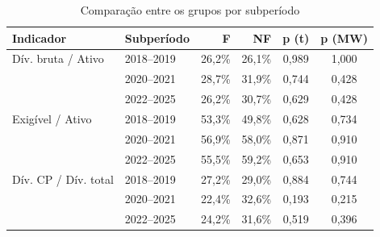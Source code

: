 \begin{table}[htb]
\caption{Comparação entre os grupos por subperíodo}\label{tab:subperiodos}
\centering\footnotesize\setlength{\tabcolsep}{4pt}
\begin{tabular}{llrrcc}
\toprule
Indicador & Subperíodo & F & NF & p (t) & p (MW) \\
\midrule
Dív. bruta / Ativo & 2018--2019 & 26,2\% & 26,1\% & 0,989 & 1,000 \\
 & 2020--2021 & 28,7\% & 31,9\% & 0,744 & 0,428 \\
 & 2022--2025 & 26,2\% & 30,7\% & 0,629 & 0,428 \\
Exigível / Ativo & 2018--2019 & 53,3\% & 49,8\% & 0,628 & 0,734 \\
 & 2020--2021 & 56,9\% & 58,0\% & 0,871 & 0,910 \\
 & 2022--2025 & 55,5\% & 59,2\% & 0,653 & 0,910 \\
Dív. CP / Dív. total & 2018--2019 & 27,2\% & 29,0\% & 0,884 & 0,744 \\
 & 2020--2021 & 22,4\% & 32,6\% & 0,193 & 0,215 \\
 & 2022--2025 & 24,2\% & 31,6\% & 0,519 & 0,396 \\
\bottomrule
\end{tabular}
\end{table}
